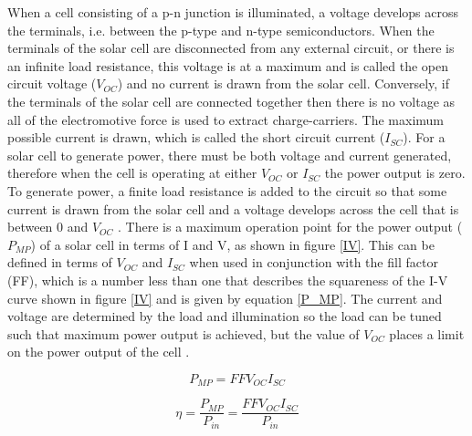 When a cell consisting of a p-n junction is illuminated, a voltage develops across the terminals, i.e. between the p-type and n-type semiconductors. When the terminals of the solar cell are disconnected from any external circuit, or there is an infinite load resistance, this voltage is at a maximum and is called the open circuit voltage ($V_{OC}$) and no current is drawn from the solar cell. Conversely, if the terminals of the solar cell are connected together then there is no voltage as all of the electromotive force is used to extract charge-carriers. The maximum possible current is drawn, which is called the short circuit current ($I_{SC}$). For a solar cell to generate power, there must be both voltage and current generated, therefore when the cell is operating at either $V_{OC}$ or $I_{SC}$ the power output is zero. To generate power, a finite load resistance is added to the circuit so that some current is drawn from the solar cell and a voltage develops across the cell that is between 0 and $V_{OC}$ \cite{Nelson1}. There is a maximum operation point for the power output ($P_{MP}$) of a solar cell in terms of I and V, as shown in figure \ref{IV}. This can be defined in terms of $V_{OC}$ and $I_{SC}$ when used in conjunction with the fill factor (FF), which is a number less than one that describes the squareness of the I-V curve \cite{handbook} shown in figure \ref{IV} and is given by equation \ref{P_MP}. The current and voltage are determined by the load and illumination so the load can be tuned such that maximum power output is achieved, but the value of $V_{OC}$ places a limit on the power output of the cell \cite{Nelson1}.

\begin{equation} \label{P_MP}
P_{MP} = FFV_{OC}I_{SC}
\end{equation}

\begin{equation} \label{efficiency}
\eta = \frac{P_{MP}}{P_{in}} = \frac{FFV_{OC}I_{SC}}{P_{in}}
\end{equation}

